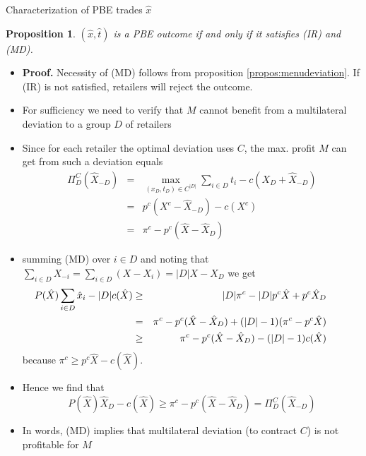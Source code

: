\documentclass[11pt,english]{beamer}
\newtheorem{proposition}{Proposition}
\begin{document}
\begin{frame}[allowframebreaks]{Characterization of PBE trades $\hat{x}$}
  \begin{proposition}
    $(\hat{x},\hat{t})$ is a PBE outcome if and only if it
    satisfies (IR) and (MD).
  \end{proposition}


    \begin{itemize}
    \item \textbf{Proof.} Necessity of (MD) follows from proposition
      \ref{propos:menudeviation}. If (IR) is not satisfied, retailers
      will reject the outcome.
    \item For sufficiency we need to verify that $M$ cannot benefit
      from a multilateral deviation to a group $D$ of retailers
    \item Since for each retailer the optimal deviation uses $C$, the
      max. profit $M$ can get from such a deviation equals
      \begin{eqnarray*}
        \Pi_D^C(\hat{X}_{-D}) &=& \max_{(x_D,t_D) \in C^{|D|}} \sum_{i \in
          D} t_i - c(X_D + \hat{X}_{-D}) \\
        &=& p^c (X^c-\hat{X}_{-D}) - c(X^c) \\
        &=& \pi^c - p^c(\hat{X}-\hat{X}_{D})
      \end{eqnarray*}
    \item summing (MD) over $i \in D$ and noting that $\sum_{i \in D}
      X_{-i} = \sum_{i \in D} (X-X_i) = |D|X - X_D$ we get
      \begin{eqnarray*}
   \hspace{-8mm}     P(\hat{X}) \sum_{i \in D} \hat{x}_i - |D| c(\hat{X}) &\geq&
        |D|\pi^c - |D| p^c \hat{X} + p^c \hat{X}_D \\
        &=& \pi^c - p^c(\hat{X}-\hat{X}_D)+(|D|-1)(\pi^c-p^c \hat{X})
      \\
        &\geq&  \pi^c - p^c(\hat{X}-\hat{X}_D)-(|D|-1)c(\hat{X})
      \end{eqnarray*}
      because $\pi^c \geq p^c \hat{X} -c(\hat{X})$.
    \item Hence we find that
      \begin{equation*}
        P(\hat{X})\hat{X}_D - c(\hat{X}) \geq \pi^c -
        p^c(\hat{X}-\hat{X}_D) = \Pi^C_D(\hat{X}_{-D})
      \end{equation*}
    \item In words, (MD) implies that multilateral deviation (to
      contract $C$) is not
      profitable for $M$

\end{itemize}
\end{frame}
\end{document}
